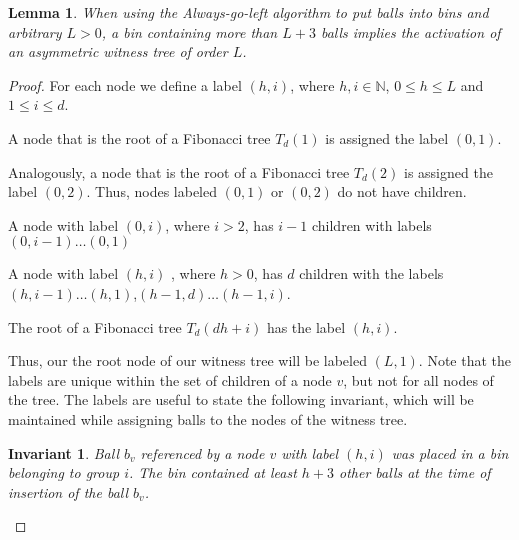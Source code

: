 \documentclass[a4paper,12pt]{article}
\newtheorem{lemma}{Lemma}
\newtheorem{invariant}{Invariant}
\begin{document}
\begin{lemma}
When using the Always-go-left algorithm to put balls into bins and arbitrary $L > 0$, a bin containing more than $L+3$ balls implies the activation of an asymmetric witness tree of order $L$.
\end{lemma}
\begin{proof}
For each node we define a label $(h, i)$, where $h, i \in \mathbb{N}$, $0 \leq h \leq L$ and  $1\leq i \leq d$. 
\begin{compactitem}
\item A node that is the root of a Fibonacci tree $T_d(1)$ is assigned the label $(0,1)$.
\item Analogously, a node that is the root of a Fibonacci tree $T_d(2)$ is assigned the label $(0,2)$. Thus, nodes labeled $(0,1)$ or $(0,2)$ do not have children.
\item A node with label $(0, i)$, where $i>2$, has $i-1$ children with labels $(0,i-1)\dots (0,1)$
\item A node with label $(h,i)$ , where $h>0$, has $d$ children with the labels $(h,i-1)\dots(h,1)$,$(h-1,d)\dots(h-1, i)$.
\item The root of a Fibonacci tree $T_d(d h+i)$ has the label $(h, i)$. 
\end{compactitem}
Thus, our the root node of our witness tree will be labeled $(L, 1)$. Note that the labels are unique within the set of children of a node $v$, but not for all nodes of the tree. The labels are useful to state the following invariant, which will be maintained while assigning balls to the nodes of the witness tree.

\begin{invariant}
Ball $b_v$ referenced by a node $v$ with label $(h,i)$ was placed in a bin belonging to group $i$. The bin contained at least $h+3$ other balls at the time of insertion of the ball $b_v$.
\end{invariant}


\end{proof}
\end{document}
